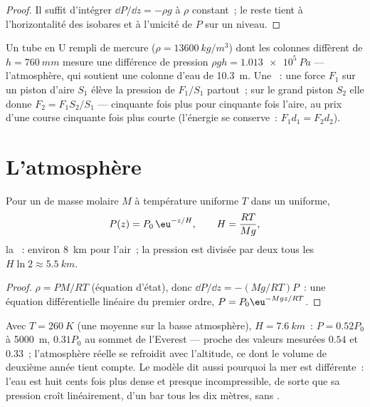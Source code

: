 \begin{proof}
Il suffit d'intégrer $\dd P/\dd z = -\rho g$ à $\rho$ constant~; le reste
tient à l'horizontalité des isobares et à l'unicité de $P$ sur un niveau.
\end{proof}

\begin{example}\label{ex:b1:fluid-statics:manometer}
Un tube en U rempli de mercure ($\rho = \qty{13600}{kg/m^3}$) dont les
colonnes diffèrent de $h = \qty{760}{mm}$ mesure une différence de pression
$\rho gh = \qty{1.013e5}{Pa}$
--- l'atmosphère, qui soutient une colonne d'eau de \qty{10.3}{m}. Une
~: une force $F_1$ sur un piston d'aire $S_1$ élève la
pression de $F_1/S_1$ partout~; sur le grand piston $S_2$ elle donne
$F_2 = F_1S_2/S_1$ --- cinquante fois plus pour cinquante fois l'aire, au
prix d'une course cinquante fois plus courte (l'énergie se conserve~: $F_1d_1 = F_2d_2$).
\end{example}

\section{L'atmosphère}

\begin{proposition}\label{prop:b1:fluid-statics:atmosphere}
Pour un  de masse molaire $M$ à température uniforme $T$ dans
un  uniforme,
\[
P(z) = P_0\,\eu^{-z/H}, \qquad H = \frac{RT}{Mg} ,
\]
la \emph{}~: environ \qty{8}{km} pour l'air~; la pression
est divisée par deux tous les $H\ln2 \approx \qty{5.5}{km}$.
\end{proposition}

\begin{proof}
$\rho = PM/RT$ (équation d'état), donc $\dd P/\dd z = -(Mg/RT)P$~: une
équation différentielle linéaire du premier ordre, $P = P_0\eu^{-Mgz/RT}$.
\end{proof}

\begin{example}\label{ex:b1:fluid-statics:altitude}
Avec $T = \qty{260}{K}$ (une moyenne sur la basse atmosphère), $H =
\qty{7.6}{km}$~: $P = 0.52P_0$ à \qty{5000}{m}, $0.31P_0$ au sommet de
l'Everest --- proche des valeurs mesurées $0.54$ et $0.33$~; l'atmosphère
réelle se refroidit avec l'altitude, ce dont le volume de deuxième année
tient compte. Le modèle dit aussi pourquoi la mer est différente~: l'eau
est huit cents fois plus dense et presque incompressible, de sorte que sa
pression croît linéairement, d'un bar tous les dix mètres, sans .
\end{example}

